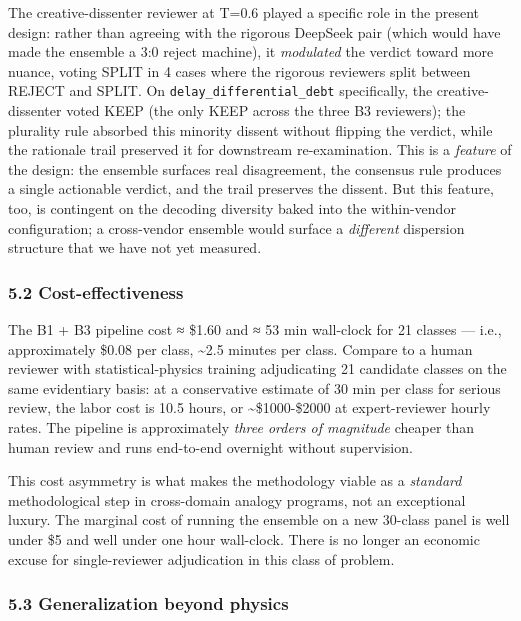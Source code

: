\documentclass[
  letterpaper,
  11pt]{article}
\begin{document}
The creative-dissenter reviewer at T=0.6 played a specific role in the
present design: rather than agreeing with the rigorous DeepSeek pair
(which would have made the ensemble a 3:0 reject machine), it
\emph{modulated} the verdict toward more nuance, voting SPLIT in 4 cases
where the rigorous reviewers split between REJECT and SPLIT. On
\texttt{delay\_differential\_debt} specifically, the creative-dissenter
voted KEEP (the only KEEP across the three B3 reviewers); the plurality
rule absorbed this minority dissent without flipping the verdict, while
the rationale trail preserved it for downstream re-examination. This is
a \emph{feature} of the design: the ensemble surfaces real disagreement,
the consensus rule produces a single actionable verdict, and the trail
preserves the dissent. But this feature, too, is contingent on the
decoding diversity baked into the within-vendor configuration; a
cross-vendor ensemble would surface a \emph{different} dispersion
structure that we have not yet measured.

\subsubsection{5.2 Cost-effectiveness}\label{cost-effectiveness}

The B1 + B3 pipeline cost ≈ \$1.60 and ≈ 53 min wall-clock for 21
classes --- i.e., approximately \$0.08 per class, \textasciitilde2.5
minutes per class. Compare to a human reviewer with statistical-physics
training adjudicating 21 candidate classes on the same evidentiary
basis: at a conservative estimate of 30 min per class for serious
review, the labor cost is 10.5 hours, or \textasciitilde\$1000-\$2000 at
expert-reviewer hourly rates. The pipeline is approximately \emph{three
orders of magnitude} cheaper than human review and runs end-to-end
overnight without supervision.

This cost asymmetry is what makes the methodology viable as a
\emph{standard} methodological step in cross-domain analogy programs,
not an exceptional luxury. The marginal cost of running the ensemble on
a new 30-class panel is well under \$5 and well under one hour
wall-clock. There is no longer an economic excuse for single-reviewer
adjudication in this class of problem.

\subsubsection{5.3 Generalization beyond
physics}\label{generalization-beyond-physics}
\end{document}
